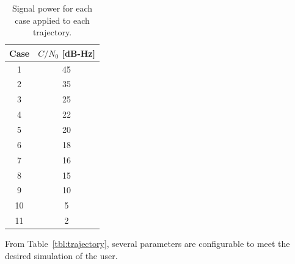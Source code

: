 \begin{table}[!ht]
    \caption{Signal power for each case applied to each trajectory.}\label{tbl:interferenceCases}
    \centering
    \begin{tabular}{cc}
        \toprule
        Case & \(C/N_0\) [dB-Hz] \\
        \midrule
        1    & 45                \\
        2    & 35                \\
        3    & 25                \\
        4    & 22                \\
        5    & 20                \\
        6    & 18                \\
        7    & 16                \\
        8    & 15                \\
        9    & 10                \\
        10    & 5                \\
        11    & 2                \\
        \bottomrule
    \end{tabular}
\end{table}

From Table~\ref{tbl:trajectory}, several parameters are configurable to meet the desired simulation of the user.

